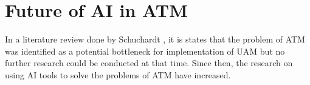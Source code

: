 \section{Future of AI in ATM}

In a literature review done by Schuchardt \cite{Schuchardt_2023}, it is states that the problem of \gls{ATM} was identified as a potential bottleneck for implementation of \gls{UAM} but no further research could be conducted at that time. 
Since then, the research on using \gls{AI} tools to solve the problems of \gls{ATM} have increased.














